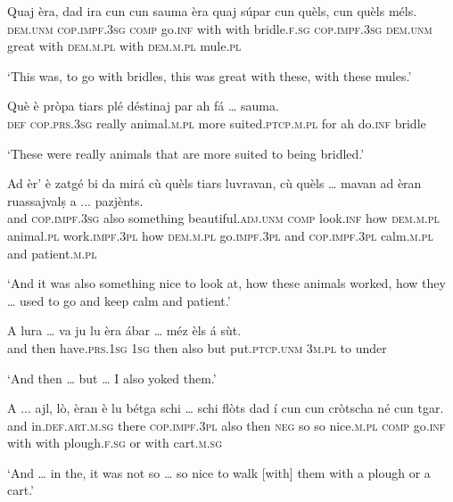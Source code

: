 \begin{linenumbers}
\gll Quaj èra, dad ira cun cun sauma èra quaj súpar cun quèls, cun quèls méls.   \\
 \textsc{dem.unm} \textsc{cop.impf.3sg} \textsc{comp} go.\textsc{inf} with with bridle.\textsc{f.sg} \textsc{cop.impf.3sg} \textsc{dem.unm} great with \textsc{dem.m.pl} with \textsc{dem.m.pl} mule.\textsc{pl}\\
\end{linenumbers}
\medskip
\glt `This was, to go with bridles, this was great with these, with these mules.'
\medskip

\begin{linenumbers}
\gll  Què è pròpa tiars plé déstinaj par ah fá … sauma.\\
 \textsc{def} \textsc{cop.prs.3sg} really animal.\textsc{m.pl} more suited.\textsc{ptcp.m.pl} for ah do.\textsc{inf} {} bridle \\
\end{linenumbers}
\medskip
\glt `These were really animals that are more suited to being bridled.'
\medskip

\begin{linenumbers}
\gll   Ad èr' è zatgé bi da mirá cù quèls tiars luvravan, cù quèls … mavan ad èran ruassajvalṣ a ... pazjènts. \\
and \textsc{cop.impf.3sg} also something beautiful.\textsc{adj.unm} \textsc{comp} look.\textsc{inf} how \textsc{dem.m.pl} animal.\textsc{pl} work.\textsc{impf.3pl} how \textsc{dem.m.pl} go.\textsc{impf.3pl} {} and \textsc{cop.impf.3pl} calm.\textsc{m.pl} and {} patient.\textsc{m.pl}  \\
\end{linenumbers}
\medskip
\glt `And it was also something nice to look at, how these animals worked, how they … used to go and keep calm and patient.'
\medskip

\begin{linenumbers}
\gll   A lura … va ju lu èra ábar … méz èls á sùt. \\
and then {} have.\textsc{prs.1sg} \textsc{1sg} then also but {} put.\textsc{ptcp.unm} \textsc{3m.pl} to under \\
\end{linenumbers}
\medskip
\glt `And then … but … I also yoked them.'
\medskip

\begin{linenumbers}
\gll  A ... ajl, lò, èran è lu bétga schi … schi flòts dad í cun cun cròtscha né cun tgar.\\
and {} in.\textsc{def.art.m.sg} there \textsc{cop.impf.3pl} also then \textsc{neg} so {} so nice.\textsc{m.pl} \textsc{comp} go.\textsc{inf} with with plough.\textsc{f.sg} or with cart.\textsc{m.sg}\\
\end{linenumbers}
\medskip
\glt `And … in the, it was not so … so nice to walk [with] them with a plough or a cart.'
\medskip

